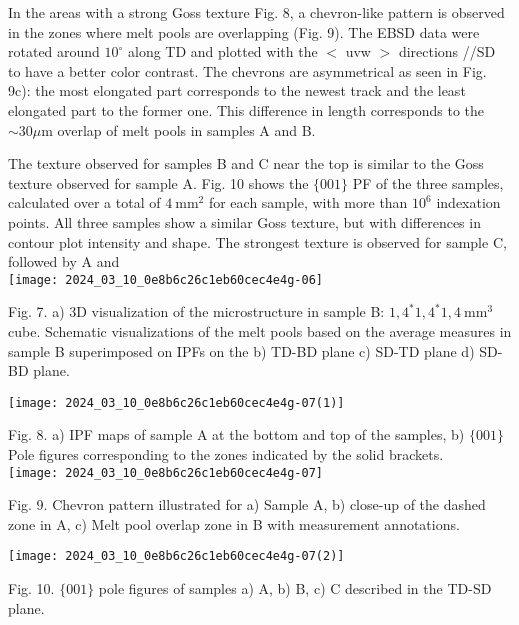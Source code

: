 \documentclass[10pt]{article}
\begin{document}
In the areas with a strong Goss texture Fig. 8, a chevron-like pattern is observed in the zones where melt pools are overlapping (Fig. 9). The EBSD data were rotated around $10^{\circ}$ along TD and plotted with the $<$ uvw $>$ directions //SD to have a better color contrast. The chevrons are asymmetrical as seen in Fig. 9c): the most elongated part corresponds to the newest track and the least elongated part to the former one. This difference in length corresponds to the $\sim 30 \mu \mathrm{m}$ overlap of melt pools in samples A and B.

The texture observed for samples B and C near the top is similar to the Goss texture observed for sample A. Fig. 10 shows the $\{001\}$ PF of the three samples, calculated over a total of $4 \mathrm{~mm}^{2}$ for each sample, with more than $10^{6}$ indexation points. All three samples show a similar Goss texture, but with differences in contour plot intensity and shape. The strongest texture is observed for sample C, followed by A and\\
\texttt{[image: 2024\_03\_10\_0e8b6c26c1eb60cec4e4g-06]}

Fig. 7. a) 3D visualization of the microstructure in sample B: $1,4^{*} 1,4^{*} 1,4 \mathrm{~mm}^{3}$ cube. Schematic visualizations of the melt pools based on the average measures in sample B superimposed on IPFs on the b) TD-BD plane c) SD-TD plane d) SD-BD plane.

\begin{center}
\texttt{[image: 2024\_03\_10\_0e8b6c26c1eb60cec4e4g-07(1)]}
\end{center}

Fig. 8. a) IPF maps of sample A at the bottom and top of the samples, b) $\{001\}$ Pole figures corresponding to the zones indicated by the solid brackets.\\
\texttt{[image: 2024\_03\_10\_0e8b6c26c1eb60cec4e4g-07]}

Fig. 9. Chevron pattern illustrated for a) Sample A, b) close-up of the dashed zone in A, c) Melt pool overlap zone in B with measurement annotations.

\begin{center}
\texttt{[image: 2024\_03\_10\_0e8b6c26c1eb60cec4e4g-07(2)]}
\end{center}

Fig. 10. $\{001\}$ pole figures of samples a) A, b) B, c) C described in the TD-SD plane.
\end{document}
